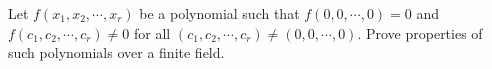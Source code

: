 Let $f(x_1, x_2, \cdots, x_r)$ be a polynomial such that $f(0, 0, \cdots, 0) = 0$ and $f(c_1, c_2, \cdots, c_r) \neq 0$ for all $(c_1, c_2, \cdots, c_r) \neq (0, 0, \cdots, 0)$. Prove properties of such polynomials over a finite field.